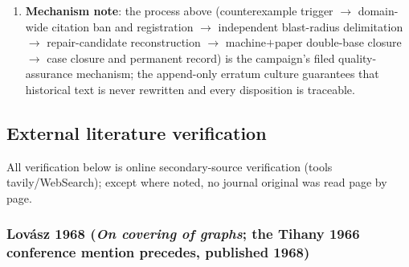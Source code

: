 \begin{enumerate}
self-flagged to-be-verified step, not a breach of a registered theorem);
wave 66 also had zero new triggers (the A196 periodicity negative result
struck a candidate object and a suggestion sentence of A192 \S6 $=$ an
honest block, not a counterexample to a registered theorem; the A197/A199/
A201 adversarial audits found zero math counterexamples; STATE \S R-56.6
row~4050); \textbf{waves 69/70 also zero new triggers} (the A205 cross-class
counterexample struck a candidate-tier machine-evidence discovery in A204
\S3.3 $=$ disposited as an erratum under the R-56 reading, no STOP written;
the A206 decision chain has zero counterexamples across five layers;
A207/A209/A211 zero math-layer counterexamples; the $56$ cases of A210 $=$
a criteria-chain-layer refinement block [an in-domain delimitation of an
open obligation], not a counterexample to a registered proposition; the
$\mu$ ontology has zero counterexamples; STOP remains absent from the
board; STATE \S R-57.6 row~4112, \S R-58.4 row~4161).
\item \textbf{Mechanism note}: the process above (counterexample trigger
$\to$ domain-wide citation ban and registration $\to$ independent blast-radius
delimitation $\to$ repair-candidate reconstruction $\to$ machine$+$paper
double-base closure $\to$ case closure and permanent record) is the
campaign's filed quality-assurance mechanism; the append-only erratum
culture guarantees that historical text is never rewritten and every
disposition is traceable.
\end{enumerate}

\subsection{External literature verification}\label{subsec:add-lit}

All verification below is online secondary-source verification (tools
tavily/WebSearch); except where noted, no journal original was read
page by page.

\subsubsection{Lov\'{a}sz 1968 (\emph{On covering of graphs}; the Tihany 1966
conference mention precedes, published 1968)}\label{subsec:add-litlovasz}

